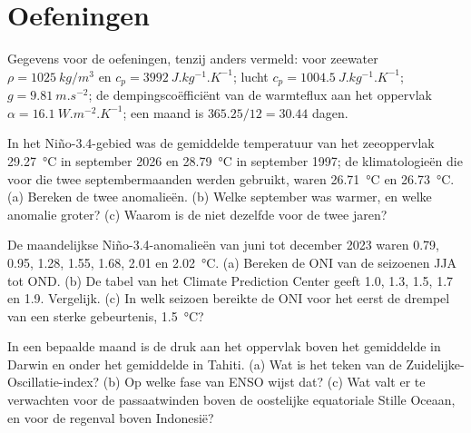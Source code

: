 \section*{Oefeningen}\label{sec:b2:climate-variability:exercises}

Gegevens voor de oefeningen, tenzij anders vermeld: voor zeewater $\rho = \qty{1025}{kg/m^3}$ en $c_p =
\qty{3992}{J.kg^{-1}.K^{-1}}$; lucht $c_p = \qty{1004.5}{J.kg^{-1}.K^{-1}}$; $g =
\qty{9.81}{m.s^{-2}}$; de dempingscoëfficiënt van de warmteflux aan het oppervlak $\alpha =
\qty{16.1}{W.m^{-2}.K^{-1}}$; een maand is $365.25/12 = 30.44$ dagen.

\begin{exercise}[$\star$]\label{exo:b2:climate-variability:1}
In het Niño-3.4-gebied was de gemiddelde temperatuur van het zeeoppervlak \qty{29.27}{\celsius} in september
2026 en \qty{28.79}{\celsius} in september 1997; de klimatologieën die voor die twee septembermaanden werden gebruikt,
waren \qty{26.71}{\celsius} en \qty{26.73}{\celsius}. (a) Bereken de twee anomalieën. (b) Welke
september was warmer, en welke anomalie groter? (c) Waarom is de  niet dezelfde voor de
twee jaren?
\end{exercise}

\begin{exercise}[$\star$]\label{exo:b2:climate-variability:2}
De maandelijkse Niño-3.4-anomalieën van juni tot december 2023 waren 0.79, 0.95, 1.28, 1.55, 1.68, 2.01
en \qty{2.02}{\celsius}. (a) Bereken de ONI van de seizoenen JJA tot OND. (b) De tabel van het
Climate Prediction Center geeft 1.0, 1.3, 1.5, 1.7 en 1.9. Vergelijk. (c) In welk seizoen bereikte de
ONI voor het eerst de drempel van een sterke gebeurtenis, \qty{1.5}{\celsius}?
\end{exercise}

\begin{exercise}[$\star$]\label{exo:b2:climate-variability:3}
In een bepaalde maand is de druk aan het oppervlak boven het gemiddelde in Darwin en onder het gemiddelde in Tahiti.
(a) Wat is het teken van de Zuidelijke-Oscillatie-index? (b) Op welke fase van ENSO wijst dat? (c) Wat
valt er te verwachten voor de passaatwinden boven de oostelijke equatoriale Stille Oceaan, en voor de
regenval boven Indonesië?
\end{exercise}

